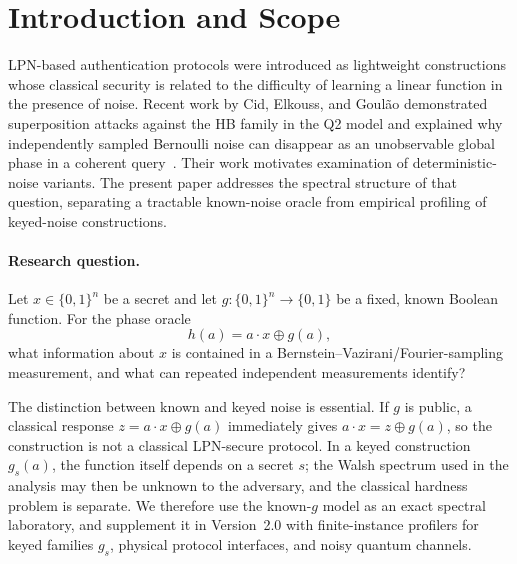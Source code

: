 \documentclass[10pt,twocolumn]{article}
\theoremstyle{definition}
\begin{document}
\section{Introduction and Scope}

LPN-based authentication protocols were introduced as lightweight constructions whose classical security is related to the difficulty of learning a linear function in the presence of noise. Recent work by Cid, Elkouss, and Goul\~ao demonstrated superposition attacks against the HB family in the Q2 model and explained why independently sampled Bernoulli noise can disappear as an unobservable global phase in a coherent query~\cite{cid2026}. Their work motivates examination of deterministic-noise variants. The present paper addresses the spectral structure of that question, separating a tractable known-noise oracle from empirical profiling of keyed-noise constructions.

\paragraph{Research question.} Let $x \in \{0,1\}^n$ be a secret and let $g : \{0,1\}^n \to \{0,1\}$ be a fixed, known Boolean function. For the phase oracle
\[ h(a) = a \cdot x \oplus g(a), \]
what information about $x$ is contained in a Bernstein--Vazirani/Fourier-sampling measurement, and what can repeated independent measurements identify?

The distinction between known and keyed noise is essential. If $g$ is public, a classical response $z = a \cdot x \oplus g(a)$ immediately gives $a \cdot x = z \oplus g(a)$, so the construction is not a classical LPN-secure protocol. In a keyed construction $g_s(a)$, the function itself depends on a secret $s$; the Walsh spectrum used in the analysis may then be unknown to the adversary, and the classical hardness problem is separate. We therefore use the known-$g$ model as an exact spectral laboratory, and supplement it in Version~2.0 with finite-instance profilers for keyed families $g_s$, physical protocol interfaces, and noisy quantum channels.
\end{document}
